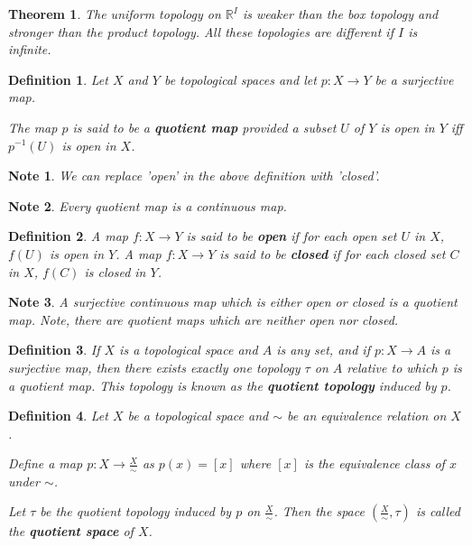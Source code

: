 \documentclass[14pt,twoside]{extreport}
\theoremstyle{dotless}
\newtheorem*{defn}{Definition}
\newtheorem*{thm}{Theorem} %
\newtheorem*{note}{Note} %
\begin{document}
\begin{thm}
    The uniform topology on $\mathbb{R}^I$ is weaker than the box topology and stronger than the product topology. 
    All these topologies are different if $I$ is infinite.
\end{thm}

\begin{defn}
    Let $X$ and $Y$ be topological spaces and let $p: X \to Y$ be a surjective map. 

    The map $p$ is said to be a \textbf{quotient map} provided a subset $U$ of $Y$ is open in $Y$ iff $p^{-1}(U)$ is open in $X$.
\end{defn}

\begin{note}
    We can replace 'open' in the above definition with 'closed'.
\end{note}

\begin{note}
    Every quotient map is a continuous map.
\end{note}

\begin{defn}
    A map $f: X \to Y$ is said to be \textbf{open} if for each open set $U$ in $X$, $f(U)$ is open in $Y$.
    A map $f: X \to Y$ is said to be \textbf{closed} if for each closed set $C$ in $X$, $f(C)$ is closed in $Y$.
\end{defn}


\begin{note}
    A surjective continuous map which is either open or closed is a quotient map. Note, there are quotient maps which are neither open nor closed.
\end{note}

\begin{defn}
    If $X$ is a topological space and $A$ is any set, and if $p: X \to A$ is a surjective map, then there exists exactly one topology $\tau$ on $A$ relative to which $p$ is a quotient map. This topology is known as the \textbf{quotient topology} induced by $p$.
\end{defn}

\begin{defn}
    Let $X$ be a topological space and $\sim$ be an equivalence relation on $X$. 

    Define a map $p: X \to \frac{X}{\sim}$ as $p(x) = [x]$ where $[x]$ is the equivalence class of $x$ under $\sim$.

    Let $\tau$ be the quotient topology induced by $p$ on $\frac{X}{\sim}$. Then the space $(\frac{X}{\sim}, \tau)$ is called the \textbf{quotient space} of $X$.
\end{defn}
\end{document}
